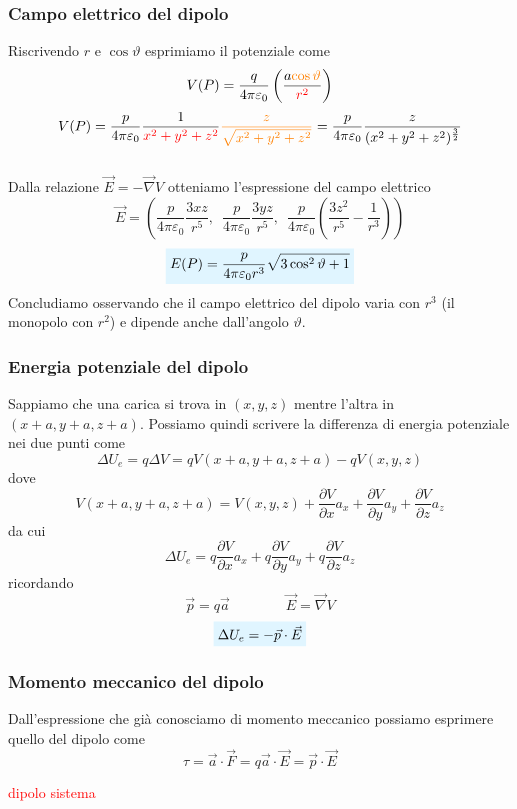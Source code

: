 \documentclass[x11names]{report}
\newcommand{\viola}[1]{%
	\colorbox{myblue}{$\displaystyle #1$}
}
\begin{document}
\subsubsection{Campo elettrico del dipolo}
Riscrivendo \(r\) e \(\cos\vartheta\) esprimiamo il potenziale come
\[
V(P) = \frac{q}{4\pi \varepsilon_0} \left(\frac{a\textcolor{orange}{\cos\vartheta}}{\textcolor{red}{r^2}}\right) 
\]
\[
V(P)= \frac{p}{4\pi\varepsilon_0}\frac{1}{\textcolor{red}{x^2 + y^2 + z^2}}\textcolor{orange}{\frac{z}{\sqrt{x^2 + y^2 + z^2}}} = \frac{p}{4\pi\varepsilon_0}\frac{z}{(x^2+y^2+z^2)^{\frac{3}{2}}}
\]\\

\noindent
Dalla relazione \(\vec{E} = -\vec{\nabla}V\) otteniamo l'espressione del campo elettrico
\[
\vec{E} = \left( \frac{p}{4\pi\varepsilon_0}\frac{3xz}{r^5},\;\ \frac{p}{4\pi\varepsilon_0}\frac{3yz}{r^5},\;\ \frac{p}{4\pi\varepsilon_0}\left(\frac{3z^2}{r^5}-\frac{1}{r^3}\right)\right) 
\]
\begin{equation}
	\viola{E(P) = \frac{p}{4\pi\varepsilon_0r^3}\sqrt{3\cos^2\vartheta + 1}}
\end{equation}
Concludiamo osservando che il campo elettrico del dipolo varia con \(r^3\) (il monopolo con \(r^2\)) e dipende anche dall'angolo \(\vartheta\).

\subsubsection{Energia potenziale del dipolo}
Sappiamo che una carica si trova in \((x,y,z)\) mentre l'altra in \((x+a,y+a,z+a)\). Possiamo quindi scrivere la differenza di energia potenziale nei due punti come 
\[
	\Delta U_e = q\Delta V = qV(x+a,y+a,z+a) - qV(x,y,z)
\]
dove
\[
	V(x+a,y+a,z+a) = V(x,y,z) + \frac{\partial V}{\partial x}a_x + \frac{\partial V}{\partial y}a_y + \frac{\partial V}{\partial z}a_z
\]
da cui 
\[
	\Delta U_e = q\frac{\partial V}{\partial x}a_x + q\frac{\partial V}{\partial y}a_y + q\frac{\partial V}{\partial z}a_z
\]
ricordando
\[
	\boxed{\vec{p} = q\vec{a}} \qquad \qquad \boxed{\vec{E} = \vec{\nabla}V}
\]
\begin{equation}
	\viola{\Delta U_e = -\vec{p} \cdot \vec{E}}
\end{equation}

\subsubsection{Momento meccanico del dipolo}
Dall'espressione che già conosciamo di momento meccanico possiamo esprimere quello del dipolo come
\[
	\tau = \vec{a}\cdot\vec{F} = q\vec{a}\cdot\vec{E} = \vec{p}\cdot\vec{E}
\]
\begin{center}
	\textcolor{red}{dipolo sistema}
\end{center}
\end{document}
